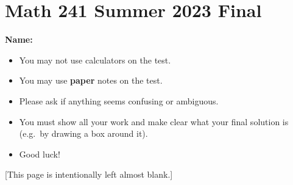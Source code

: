 \documentclass[11pt, addpoints]{exam}
\begin{document}
\section*{Math 241 Summer 2023 Final}

\textbf{Name:}

\begin{flushright}
\gradetable[v][questions]
\end{flushright}     

\begin{itemize}
\item You may not use calculators on the test.  
\item You may use \textbf{paper} notes on the test.
\item Please ask if anything seems confusing or ambiguous.
\item You must show all your work and make clear what your final solution is (e.g.\ by drawing a box around it).
\item Good luck!
\end{itemize}

           

\pagebreak

[This page is intentionally left almost blank.]

\pagebreak
\end{document}
